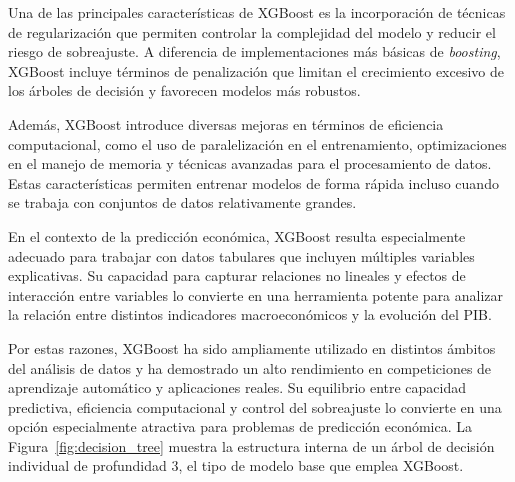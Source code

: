 Una de las principales características de XGBoost es la incorporación de técnicas de regularización que permiten controlar la complejidad del modelo y reducir el riesgo de sobreajuste. A diferencia de implementaciones más básicas de \textit{boosting}, XGBoost incluye términos de penalización que limitan el crecimiento excesivo de los árboles de decisión y favorecen modelos más robustos. \citep{chen_guestrin_2016}

Además, XGBoost introduce diversas mejoras en términos de eficiencia computacional, como el uso de paralelización en el entrenamiento, optimizaciones en el manejo de memoria y técnicas avanzadas para el procesamiento de datos. Estas características permiten entrenar modelos de forma rápida incluso cuando se trabaja con conjuntos de datos relativamente grandes. \citep{chen_guestrin_2016}

En el contexto de la predicción económica, XGBoost resulta especialmente adecuado para trabajar con datos tabulares que incluyen múltiples variables explicativas. Su capacidad para capturar relaciones no lineales y efectos de interacción entre variables lo convierte en una herramienta potente para analizar la relación entre distintos indicadores macroeconómicos y la evolución del PIB. \citep{chen_guestrin_2016}

Por estas razones, XGBoost ha sido ampliamente utilizado en distintos ámbitos del análisis de datos y ha demostrado un alto rendimiento en competiciones de aprendizaje automático y aplicaciones reales. Su equilibrio entre capacidad predictiva, eficiencia computacional y control del sobreajuste lo convierte en una opción especialmente atractiva para problemas de predicción económica. La Figura~\ref{fig:decision_tree} muestra la estructura interna de un árbol de decisión individual de profundidad 3, el tipo de modelo base que emplea XGBoost.

